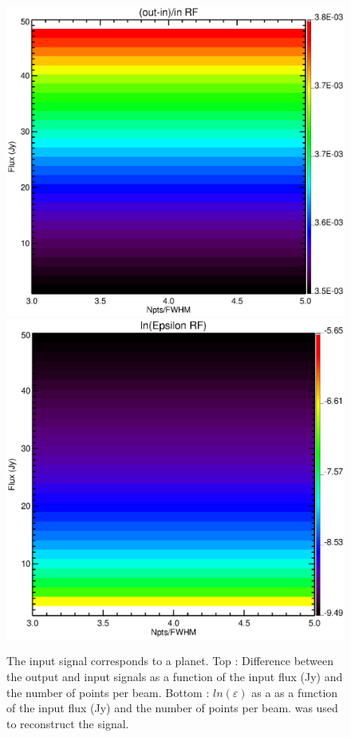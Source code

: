 \begin{figure}[h]
\center
	\includegraphics[scale=0.5]{Figures/diff_rf_planet.eps}
	\includegraphics[scale=0.5]{Figures/epsilon_rf_planet.eps}
	\caption{The input signal corresponds to a planet. Top : Difference between the output and input signals as a function of the input flux (Jy) and the number of points per beam. Bottom : $ln(\varepsilon)$ as a as a function of the input flux (Jy) and the number of points per beam. \cf was used to reconstruct the signal.}
	\label{fig:epsilon-planet}
\end{figure}

